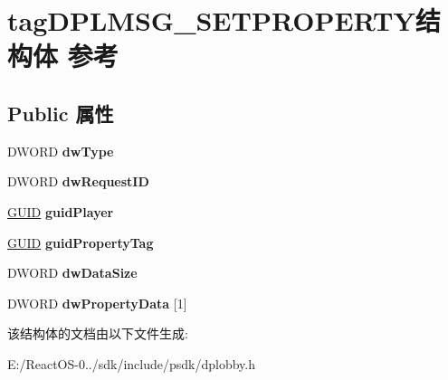 \hypertarget{structtag_d_p_l_m_s_g___s_e_t_p_r_o_p_e_r_t_y}{}\section{tag\+D\+P\+L\+M\+S\+G\+\_\+\+S\+E\+T\+P\+R\+O\+P\+E\+R\+T\+Y结构体 参考}
\label{structtag_d_p_l_m_s_g___s_e_t_p_r_o_p_e_r_t_y}
\subsection*{Public 属性}
\begin{DoxyCompactItemize}
\item 
\mbox{\label{structtag_d_p_l_m_s_g___s_e_t_p_r_o_p_e_r_t_y_a814443556c9b42b6e40591c8a84512ca}} 
D\+W\+O\+RD {\bfseries dw\+Type}
\item 
\mbox{\label{structtag_d_p_l_m_s_g___s_e_t_p_r_o_p_e_r_t_y_a36116571b514dcc4d0b5d07a70e2135c}} 
D\+W\+O\+RD {\bfseries dw\+Request\+ID}
\item 
\mbox{\label{structtag_d_p_l_m_s_g___s_e_t_p_r_o_p_e_r_t_y_a7b9ec79fe00fff9cb3b474adf36c1725}} 
\hyperlink{interface_g_u_i_d}{G\+U\+ID} {\bfseries guid\+Player}
\item 
\mbox{\label{structtag_d_p_l_m_s_g___s_e_t_p_r_o_p_e_r_t_y_ae395c9fe4c5ee8c119a997ba6aa00b34}} 
\hyperlink{interface_g_u_i_d}{G\+U\+ID} {\bfseries guid\+Property\+Tag}
\item 
\mbox{\label{structtag_d_p_l_m_s_g___s_e_t_p_r_o_p_e_r_t_y_a4a6bcf90ccb2c2fafa2c4990413126b2}} 
D\+W\+O\+RD {\bfseries dw\+Data\+Size}
\item 
\mbox{\label{structtag_d_p_l_m_s_g___s_e_t_p_r_o_p_e_r_t_y_a4ea1aaf88d689d613d3162f78d03da26}} 
D\+W\+O\+RD {\bfseries dw\+Property\+Data} \mbox{[}1\mbox{]}
\end{DoxyCompactItemize}


该结构体的文档由以下文件生成\+:\begin{DoxyCompactItemize}
\item 
E\+:/\+React\+O\+S-\/0../sdk/include/psdk/dplobby.\+h\end{DoxyCompactItemize}
